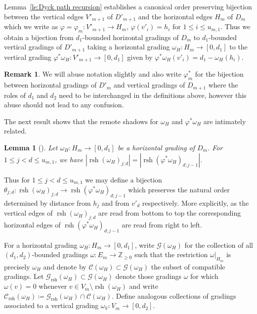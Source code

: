 \documentclass[10pt]{amsart}
\newtheorem{lemma}[theorem]{Lemma}
\theoremstyle{definition}
\newtheorem{remark}[theorem]{Remark}
\newcommand{\cC}{\mathcal{C}}
\newcommand{\cG}{\mathcal{G}}
\newcommand{\ZZ}{\mathbb{Z}}
\DeclareMathOperator{\rsh}{rsh}
\begin{document}
Lemma~\ref{le:Dyck path recursion} establishes a canonical order preserving bijection between the vertical edges $V'_{m+1}$ of $D'_{m+1}$ and the horizontal edges $H_m$ of $D_m$ which we write as $\varphi=\varphi_m:V'_{m+1}\to H_m$, $\varphi(v'_i)=h_i$ for $1\le i\le u_{m,1}$. 
Thus we obtain a bijection from $d_1$-bounded horizontal gradings of $D_m$ to $d_1$-bounded vertical gradings of $D'_{m+1}$ taking a horizontal grading $\omega_H:H_m\to[0,d_1]$ to the vertical grading $\varphi^*\omega_H:V'_{m+1}\to[0,d_1]$ given by $\varphi^*\omega_H(v'_i)=d_1-\omega_H(h_i)$.
\begin{remark}
 We will abuse notation slightly and also write $\varphi^*_m$ for the bijection between horizontal gradings of $D'_m$ and vertical gradings of $D_{m+1}$ where the roles of $d_1$ and $d_2$ need to be interchanged in the definitions above, however this abuse should not lead to any confusion.
\end{remark}

The next result shows that the remote shadows for $\omega_H$ and $\varphi^*\omega_H$ are intimately related.
\begin{lemma}[{\cite[Corollary~4.18]{rupel2}}]
 \label{le:remote shadow cardinalities}
 Let $\omega_H:H_m\to[0,d_1]$ be a horizontal grading of $D_m$.
 For $1\le j<d\le u_{m,1}$, we have $|\rsh(\omega_H)_{j;d}|=|\rsh(\varphi^*\omega_H)_{d;j-1}|$.
\end{lemma}

Thus for $1\le j<d\le u_{m,1}$ we may define a bijection $\theta_{j;d}:\rsh(\omega_H)_{j;d}\to\rsh(\varphi^*\omega_H)_{d;j-1}$ which preserves the natural order determined by distance from $h_j$ and from $v'_d$ respectively. More explicitly, as the vertical edges of $\rsh(\omega_H)_{j;d}$ are read from bottom to top the corresponding horizontal edges of $\rsh(\varphi^*\omega_H)_{d;j-1}$ are read from right to left.

For a horizontal grading $\omega_H:H_m\to[0,d_1]$, write $\cG(\omega_H)$ for the collection of all $(d_1,d_2)$-bounded gradings $\omega:E_m\to\ZZ_{\ge0}$ such that the restriction $\omega|_{H_m}$ is precisely $\omega_H$ and denote by $\cC(\omega_H)\subset\cG(\omega_H)$ the subset of compatible gradings.
Let $\cG_{\rsh}(\omega_H)\subset\cG(\omega_H)$ denote those gradings $\omega$ for which $\omega(v)=0$ whenever $v\in V_m\setminus\rsh(\omega_H)$ and write $\cC_{\rsh}(\omega_H)\coloneqq \cG_{\rsh}(\omega_H)\cap\cC(\omega_H)$.
Define analogous collections of gradings associated to a vertical grading $\omega_V:V_m\to[0,d_2]$.
\end{document}
